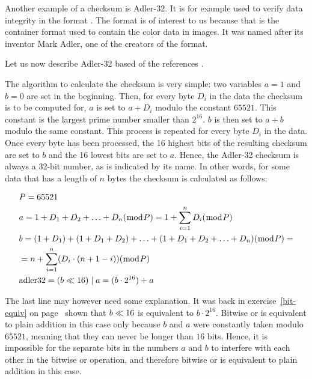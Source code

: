 \newcommand{\adlerchk}{Adler-32\xspace}

Another example of a checksum is \adlerchk. It is for example used to
verify data integrity in the \zlib format
\cite{gailly96:_zlib_compr_data_format_specif}. The \zlib format is of
interest to us because that is the container format used to contain
the color data in \png images. It was named after its inventor Mark
Adler, one of the creators of the \zlib format.

Let us now describe \adlerchk based of the references
\cite{gailly96:_zlib_compr_data_format_specif,maxino:_revis_fletc_adler_check,DBLP:journals-tdsc-MaxinoK09_koopman}.

The algorithm to calculate the checksum is very simple: two variables
$a=1$ and $b=0$ are set in the beginning. Then, for every byte $D_i$
in the data the checksum is to be computed for, $a$ is set to $a +
D_i$ modulo the constant $65521$. This constant is the largest prime
number smaller than $2^{16}$. $b$ is then set to $a + b$ modulo the
same constant.  This process is repeated for every byte $D_i$ in the
data. Once every byte has been processed, the 16 highest bits of the
resulting checksum are set to $b$ and the 16 lowest bits are set to
$a$. Hence, the \adlerchk checksum is always a 32-bit number, as is
indicated by its name. In other words, for some data that has a length
of $n$ bytes the checksum is calculated as follows:

\begin{align*}
    & P = 65521 \\
    & a = 1 + D_1 + D_2 + \ldots + D_n (\bmod{P}) = 1 +
    \displaystyle\sum_{i = 1}^{n}D_i (\bmod{P}) \\
    & b = (1 + D_1) + (1 + D_1 + D_2) + \ldots + (1 + D_1 + D_2 + \ldots +
    D_n) (\bmod{P}) = \\
    & = n + \displaystyle\sum_{i = 1}^{n}(D_i \cdot (n + 1 - i))
    (\bmod{P}) \\
    & \text{adler32} = (b \ll 16) \mathrel{|} a = (b \cdot 2^{16}) + a
\end{align*}

The last line may however need some explanation. It was back in
exercise~\ref{bit-equiv} on page~\pageref{bit-equiv} shown that $b
\ll 16$ is equivalent to $b \cdot 2^{16}$. Bitwise or is
equivalent to plain addition in this case only because $b$ and $a$
were constantly taken modulo $65521$, meaning that they can never be
longer than $16$ bits. Hence, it is impossible for the separate bits
in the numbers $a$ and $b$ to interfere with each other in the bitwise
or operation, and therefore bitwise or is equivalent to plain addition
in this case.

